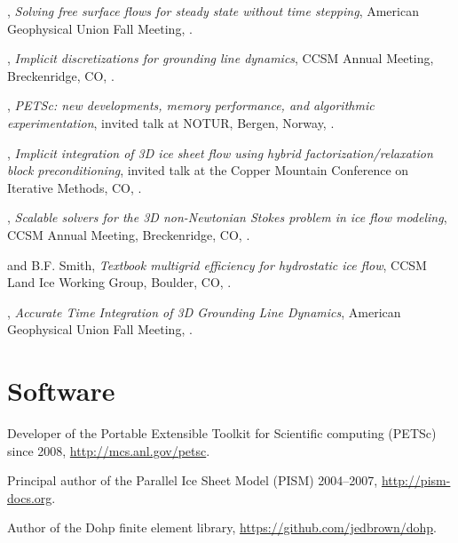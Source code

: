 \documentclass[10pt,letterpaper]{article}
\newcommand\ptitle[1]{\textit{#1}} %
\renewenvironment{itemize}{
  \begin{list}{}{
    \setlength{\leftmargin}{1.5em}
    \setlength{\itemsep}{0.25em}
    \setlength{\parskip}{0pt}
    \setlength{\parsep}{0.25em}
  }
}{
  \end{list}
}
\begin{document}
\begin{itemize}
\item {\JedBrown}, \ptitle{Solving free surface flows for steady state without time stepping}, American Geophysical Union Fall Meeting, .
\item {\JedBrown}, \ptitle{Implicit discretizations for grounding line dynamics}, CCSM Annual Meeting, Breckenridge, CO,  .
\item {\JedBrown}, \ptitle{PETSc: new developments, memory performance, and algorithmic experimentation}, invited talk at NOTUR, Bergen, Norway, .
\item {\JedBrown}, \ptitle{Implicit integration of 3D ice sheet flow using hybrid factorization/relaxation block preconditioning}, invited talk at the Copper Mountain Conference on Iterative Methods, CO, .
\item {\JedBrown}, \ptitle{Scalable solvers for the 3D non-Newtonian Stokes problem in ice flow modeling}, CCSM Annual Meeting, Breckenridge, CO, .
\item {\JedBrown} and B.F. Smith, \ptitle{Textbook multigrid efficiency for hydrostatic ice flow}, CCSM Land Ice Working Group, Boulder, CO, .
\item {\JedBrown}, \ptitle{Accurate Time Integration of 3D Grounding Line Dynamics}, American Geophysical Union Fall Meeting, .
\end{itemize}

\section*{Software}
\begin{itemize}
\item Developer of the Portable Extensible Toolkit for Scientific computing (PETSc) since 2008, \url{http://mcs.anl.gov/petsc}.
\item Principal author of the Parallel Ice Sheet Model (PISM) 2004--2007, \url{http://pism-docs.org}.
\item Author of the Dohp finite element library, \url{https://github.com/jedbrown/dohp}.
\end{itemize}
\end{document}
